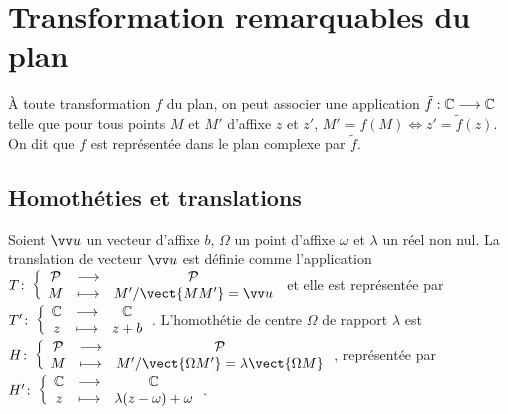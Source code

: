 \section{Transformation remarquables du plan}

À toute transformation $f$ du plan, on peut associer une application $\tilde{f} : \mathbb{C} \longrightarrow \mathbb{C}$ telle que pour tous points $M$ et $M'$ d'affixe $z$ et $z'$, $M'=f(M) \iff z'=\tilde{f}(z)$. On dit que $f$ est représentée dans le plan complexe par $\tilde{f}$.

\subsection{Homothéties et translations}
\begin{defdef}
  Soient $\vu$ un vecteur d'affixe $b$, $\Omega$ un point d'affixe $\omega$ et $\lambda$ un réel non nul. La translation de vecteur $\vu$ est définie comme l'application $\fonction{T}{\P}{\P}{M}{M' / \vect{MM'}=\vu}$ et elle est représentée par $T'\colon \left\{\begin{array}{ccc} \mathbb{C} & \longrightarrow &\mathbb{C}\\ z & \longmapsto & z+b \end{array} \right.$. L'homothétie de centre $\Omega$ de rapport $\lambda$ est $\fonction{H}{\P}{\P}{M}{M' / \vect{\Omega M'}=\lambda \vect{\Omega M}}$, représentée par $H'\colon \left\{\begin{array}{ccc} \mathbb{C} & \longrightarrow &\mathbb{C}\\ z & \longmapsto & \lambda(z-\omega)+\omega \end{array} \right.$.
\end{defdef}

